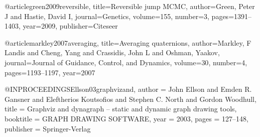 \begin{singlespace}


\end{singlespace}


@article{green2009reversible,
  title={Reversible jump MCMC},
  author={Green, Peter J and Hastie, David I},
  journal={Genetics},
  volume={155},
  number={3},
  pages={1391--1403},
  year={2009},
  publisher={Citeseer}
}



@article{markley2007averaging,
  title={Averaging quaternions},
  author={Markley, F Landis and Cheng, Yang and Crassidis, John L and Oshman, Yaakov},
  journal={Journal of Guidance, Control, and Dynamics},
  volume={30},
  number={4},
  pages={1193--1197},
  year={2007}
}

@INPROCEEDINGS{Ellson03graphvizand,
    author = {John Ellson and Emden R. Gansner and Eleftherios Koutsofios and Stephen C. North and Gordon Woodhull},
    title = {Graphviz and dynagraph – static and dynamic graph drawing tools},
    booktitle = {GRAPH DRAWING SOFTWARE},
    year = {2003},
    pages = {127--148},
    publisher = {Springer-Verlag}
}
